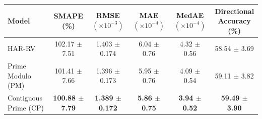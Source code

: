 \begin{tabular}{@{}lccccc@{}}
\toprule
Model & SMAPE (\%) & \shortstack{RMSE\\$(\times 10^{-3})$} & \shortstack{MAE\\$(\times 10^{-4})$} & \shortstack{MedAE\\$(\times 10^{-4})$} & \shortstack{Directional\\Accuracy (\%)} \\
\midrule
HAR-RV & 102.17 $\pm$ 7.51 & 1.403 $\pm$ 0.174 & 6.04 $\pm$ 0.76 & 4.32 $\pm$ 0.56 & 58.54 $\pm$ 3.69 \\
Prime Modulo (PM) & 101.41 $\pm$ 7.66 & 1.396 $\pm$ 0.173 & 5.95 $\pm$ 0.76 & 4.09 $\pm$ 0.54 & 59.11 $\pm$ 3.82 \\
Contiguous Prime (CP) & \textbf{100.88 $\pm$ 7.79} & \textbf{1.389 $\pm$ 0.172} & \textbf{5.86 $\pm$ 0.75} & \textbf{3.94 $\pm$ 0.52} & \textbf{59.49 $\pm$ 3.90} \\
\bottomrule
\end{tabular}
